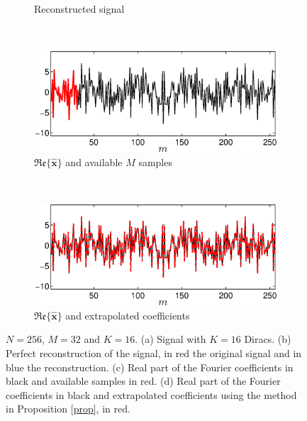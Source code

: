 \documentclass{article}
\def\bhx{\bm{\hat{x}}}
\renewcommand{\Re}[1]{\mathfrak{Re}\lbrace#1\rbrace}
\begin{document}
\begin{figure}[t]
\begin{subfigure}{.22\textwidth}
\caption{Reconstructed signal}
\end{subfigure}
\\
\begin{subfigure}{.44\textwidth}
\includegraphics[width=\linewidth]{figures/ft_signal_M_256_N_32_K_16}
\caption{$\Re{\bhx}$ and available $M$ samples}
\end{subfigure}
\\
\begin{subfigure}{.44\textwidth}
\includegraphics[width=\linewidth]{figures/ft_extrapolate_signal_M_256_N_32_K_16}
\caption{$\Re{\bhx}$ and extrapolated coefficients}
\end{subfigure}
\caption{$N=256$, $M=32$ and $K=16$. (a) Signal with $K=16$ Diracs. (b) Perfect reconstruction
of the signal, in red the original signal and in blue the reconstruction. (c) Real part of the 
Fourier coefficients in black and available samples in red. (d) Real part of the Fourier 
coefficients in black and extrapolated coefficients using the method in Proposition
\ref{prop}, in red.}
\label{fig:signal}
\end{figure}
\end{document}
